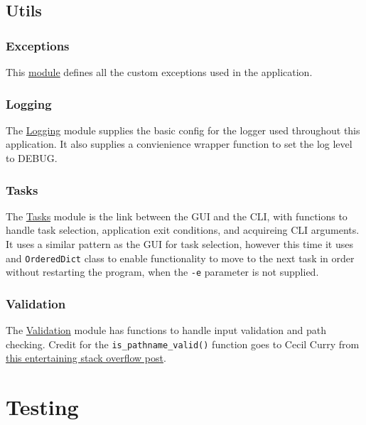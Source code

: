 \documentclass[11pt]{article}
\newcommand{\code}[1]{\colorbox{light-gray}{\texttt{#1}}}
\begin{document}
\subsection{Utils}
\subsubsection{Exceptions}
This \href{https://www2.macs.hw.ac.uk/~sf52/DocuTrace/html/DocuTrace.Utils.html#module-DocuTrace.Utils.Exceptions}{module} defines all the custom exceptions used in the application.

\subsubsection{Logging}
The \href{https://www2.macs.hw.ac.uk/~sf52/DocuTrace/html/DocuTrace.Utils.html#module-DocuTrace.Utils.Logging}{Logging} module supplies the basic config for the logger used throughout this application.
It also supplies a convienience wrapper function to set the log level to DEBUG.


\subsubsection{Tasks}
The \href{https://www2.macs.hw.ac.uk/~sf52/DocuTrace/html/DocuTrace.Utils.html#module-DocuTrace.Utils.Tasks}{Tasks} module is the link between the GUI and the CLI, with functions to handle task selection, application exit conditions, and acquireing CLI arguments.
It uses a similar pattern as the GUI for task selection, however this time it uses and \code{OrderedDict} class to enable functionality to move to the next task in order without restarting the program, when the \code{-e} parameter is not supplied.

\subsubsection{Validation}
The \href{https://www2.macs.hw.ac.uk/~sf52/DocuTrace/html/DocuTrace.Utils.html#module-DocuTrace.Utils.Validation}{Validation} module has functions to handle input validation and path checking. Credit for the \code{is\_pathname\_valid()} function goes to Cecil Curry from \href{https://stackoverflow.com/questions/9532499/check-whether-a-path-is-valid-in-python-without-creating-a-file-at-the-paths-ta}{this entertaining stack overflow post}\autocite{FilesystemsCheckWhether}.


\section{Testing}
\end{document}
